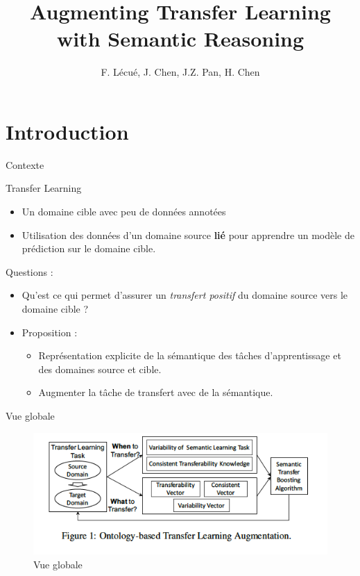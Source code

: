 \documentclass{beamer}
\title[GT IA]{Augmenting Transfer Learning with Semantic Reasoning}
\author{F. Lécué, J. Chen, J.Z. Pan, H. Chen}
\institute{IJCAI 2019}
\begin{document}
\begin{frame}
  \titlepage
\end{frame}


\section{Introduction}

\begin{frame}{Contexte}

\begin{block}{Transfer Learning}
\begin{itemize}
  \item Un domaine cible avec peu de données annotées
  \item Utilisation des données d'un domaine source \textbf{lié} pour apprendre un modèle de prédiction sur le domaine cible.
\end{itemize}
\end{block}
Questions :
\begin{itemize}
    \item Qu'est ce qui permet d'assurer un \textit{transfert positif} du domaine source vers le domaine cible ?
    \item Proposition :
    \begin{itemize}
        \item Représentation explicite de la sémantique des tâches d'apprentissage et des domaines source et cible.
        \item Augmenter la tâche de transfert avec de la sémantique.
    \end{itemize}
\end{itemize}
\end{frame}




\begin{frame}{Vue globale}
\begin{figure}
    \centering
    \includegraphics[scale=0.6]{Figures/vueglobale.png}
    \caption{Vue globale}
    \label{fig:my_label}
\end{figure}

\end{frame}
\end{document}
